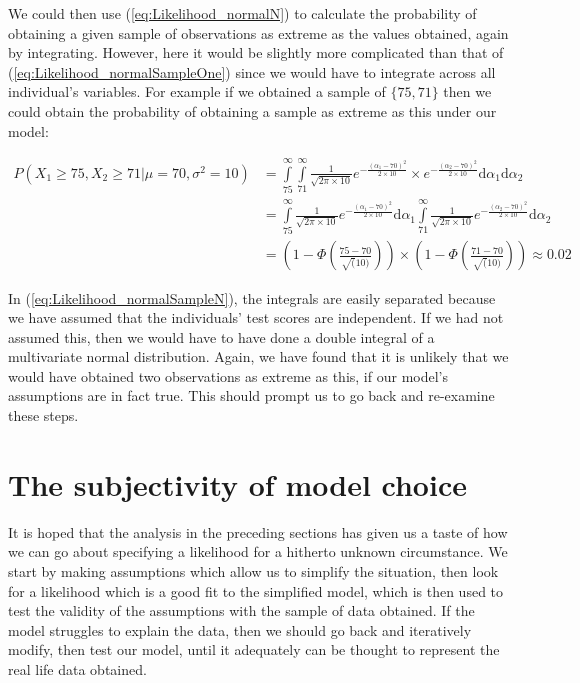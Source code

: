 \documentclass[11pt,fullpage]{book}
\begin{document}
We could then use (\ref{eq:Likelihood_normalN}) to calculate the probability of obtaining a given sample of observations as extreme as the values obtained, again by integrating. However, here it would be slightly more complicated than that of (\ref{eq:Likelihood_normalSampleOne}) since we would have to integrate across all individual's variables. For example if we obtained a sample of $\{75,71\}$ then we could obtain the probability of obtaining a sample as extreme as this under our model:

\begin{equation}
\begin{align}
P(X_1\geq 75,X_2\geq 71|\mu=70,\sigma^2=10) &= \int\limits_{75}^{\infty}\int\limits_{71}^{\infty}\frac{1}{\sqrt{2\pi\times 10}}e^{-\frac{(\alpha_1-70)^2}{2\times 10}}\times e^{-\frac{(\alpha_2-70)^2}{2\times 10}} \mathrm{d}\alpha_1 \mathrm{d}\alpha_2\\
& = \int\limits_{75}^{\infty} \frac{1}{\sqrt{2\pi\times 10}}e^{-\frac{(\alpha_1-70)^2}{2\times 10}} \mathrm{d}\alpha_1  \int\limits_{71}^{\infty} \frac{1}{\sqrt{2\pi\times 10}}e^{-\frac{(\alpha_2-70)^2}{2\times 10}} \mathrm{d}\alpha_2\\
& = (1-\Phi\left(\frac{75-70}{\sqrt(10)}\right))\times (1-\Phi\left(\frac{71-70}{\sqrt(10)}\right)) \approx 0.02
\end{align}
\end{equation}\label{eq:Likelihood_normalSampleN}

In (\ref{eq:Likelihood_normalSampleN}), the integrals are easily separated because we have assumed that the individuals' test scores are independent. If we had not assumed this, then we would have to have done a double integral of a multivariate normal distribution. Again, we have found that it is unlikely that we would have obtained two observations as extreme as this, if our model's assumptions are in fact true. This should prompt us to go back and re-examine these steps.

\section{The subjectivity of model choice}
It is hoped that the analysis in the preceding sections has given us a taste of how we can go about specifying a likelihood for a hitherto unknown circumstance. We start by making assumptions which allow us to simplify the situation, then look for a likelihood which is a good fit to the simplified model, which is then used to test the validity of the assumptions with the sample of data obtained. If the model struggles to explain the data, then we should go back and iteratively modify, then test our model, until it adequately can be thought to represent the real life data obtained.
\end{document}
